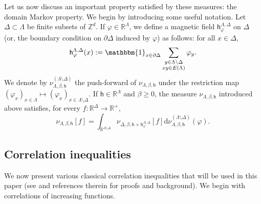 \documentclass[11pt,a4paper]{article}
\theoremstyle{definition}
\numberwithin{equation}{section}
\begin{document}
Let us now discuss an important property satisfied by these measures: the domain Markov property. We begin by introducing some useful notation. Let $\Delta\subset \Lambda$ be finite subsets of $\mathbb Z^d$. If $\varphi\in \mathbb R^\Lambda$, we define a magnetic field $\mathsf{h}^{\Lambda,\Delta}_\varphi$ on $\Delta$ (or, the boundary condition on $\partial \Delta$ induced by $\varphi$) as follows: for all $x\in \Delta$,
\begin{equation}\label{eq:bc->mag_field}
\mathsf{h}^{\Lambda,\Delta}_\varphi(x):=\mathbbm{1}_{x\in \partial \Delta}\sum_{\substack{y\in \Lambda\setminus \Delta\\xy\in E(\Lambda)}}\varphi_y.
\end{equation}
We denote by $\nu_{\Lambda,\beta,\mathsf{h}}^{(\Lambda\setminus\Delta)}$ the push-forward of $\nu_{\Lambda,\beta,\mathsf{h}}$ under the restriction map $(\varphi_x)_{x\in \Lambda}\mapsto (\varphi_x)_{x\in \Lambda\setminus \Delta}$.
If $\mathsf{h}\in \mathbb R^\Lambda$ and $\beta\geq0$, the measure $\nu_{\Lambda,\beta,\mathsf{h}}$ introduced above satisfies, for every $f:\mathbb R^{\Delta}\rightarrow \mathbb R^+$,
\begin{equation}\label{eq:dlr}
    \nu_{\Lambda,\beta,\mathsf{h}}[f]=\int_{\mathbb R^{\Lambda\setminus \Delta}}\nu_{\Delta,\beta,\mathsf{h}+\mathsf{h}^{\Lambda,\Delta}_\varphi}[f]\mathrm{d}\nu_{\Lambda,\beta,\mathsf{h}}^{(\Lambda\setminus\Delta)}(\varphi).
\end{equation}






\subsection{Correlation inequalities}\label{sec:correlation_ineq}

We now present various classical correlation inequalities that will be used in this paper (see \cite{GunaratnamPanagiotisPanisSeveroPhi42022} and references therein for proofs and background). We begin with correlations of increasing functions.
\end{document}
